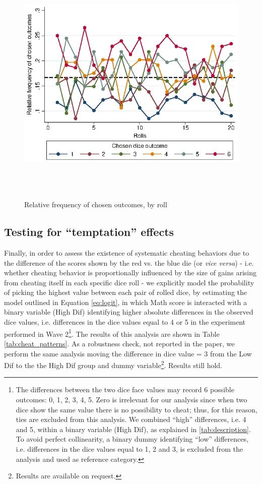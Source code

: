 \documentclass[authoryear, preprint, review, 12pt]{elsarticle}
\begin{document}
\begin{figure}[h!]
\centering
\includegraphics[width=12cm,height=12cm, keepaspectratio]{figures/rolls_frequency.eps}
\caption{Relative frequency of chosen outcomes, by roll}\label{fig:rollfreq}
\end{figure}

\subsection{Testing for \enquote{temptation} effects}
\label{sub:temptation}
Finally, in order to assess the existence of systematic cheating behaviors due to the difference of the scores shown by the red vs. the blue die (or \textit{vice versa}) - i.e. whether cheating behavior is proportionally influenced by the size of gains arising from cheating itself in each specific dice roll - we explicitly model the probability of picking the highest value between each pair of rolled dice, by estimating the model outlined in Equation \ref{eq:logit}, in which Math score is interacted with a binary variable (High Dif) identifying higher absolute differences in the observed dice values, i.e. differences in the dice values equal to 4 or 5 in the experiment performed in Wave 2\footnote{The differences between the two dice face values may record 6 possible outcomes: 0, 1, 2, 3, 4, 5. Zero is irrelevant for our analysis since when two dice show the same value there is no possibility to cheat; thus, for this reason, ties are excluded from this analysis. We combined \enquote{high} differences, i.e. 4 and 5, within a binary variable (High Dif), as explained in \ref{tab:description}. To avoid perfect collinearity, a binary dummy identifying \enquote{low} differences, i.e. differences in the dice values equal to 1, 2 and 3, is excluded from the analysis and used as reference category.}. The results of this analysis are shown in Table \ref{tab:cheat_patterns}. As a robustness check, not reported in the paper, we perform the same analysis moving the difference in dice value = 3 from the Low Dif to the the High Dif group and dummy variable\footnote{Results are available on request.}. Results still hold.
\end{document}

